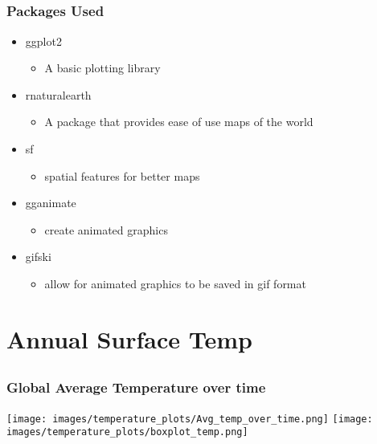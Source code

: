 \documentclass[handout, xcolor=dvipsnames]{beamer}
\begin{document}
\subsection{}
\begin{frame}
	\frametitle{Packages Used}
	\begin{itemize}
    	\item ggplot2
        \begin{itemize}
            \item A basic plotting library
        \end{itemize}
    	\item rnaturalearth
        \begin{itemize}
            \item A package that provides ease of use maps of the world
        \end{itemize}
    	\item sf
               \begin{itemize}
                   \item  spatial features for better maps
               \end{itemize} 
    	\item gganimate
            \begin{itemize}
                \item create animated graphics
            \end{itemize}
    	\item gifski 
            \begin{itemize} 
                \item allow for animated graphics to be saved in gif format
            \end{itemize}
                
    \end{itemize}
\end{frame}

\section{Annual Surface Temp}  


\subsection{}

\begin{frame}
	\frametitle{Global Average Temperature over time}
	\begin{center} 
		\texttt{[image: images/temperature\_plots/Avg\_temp\_over\_time.png]} \hspace{1pt}
            \texttt{[image: images/temperature\_plots/boxplot\_temp.png]} \hspace{1pt}
	\end{center}
\end{frame}
\end{document}
